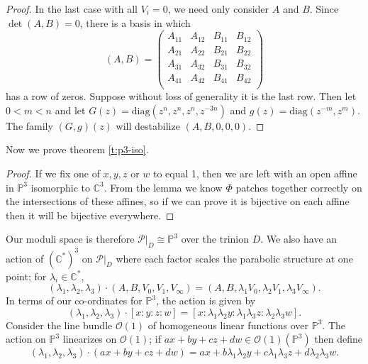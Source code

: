 \documentclass[]{article}
\newcommand{\C}{\mathbb{C}}
\newcommand{\OO}{\mathcal{O}}
\newcommand{\cP}{\mathcal{P}}
\newcommand{\PP}{\mathbb{P}}
\begin{document}
\begin{proof}
		In the last case with all $V_i=0$, we need only consider $A$ and $B$. Since $\det(A,B) = 0$, there is a basis in which
		\begin{equation}
			(A,B) = 
			\begin{pmatrix}
		A_{11} & A_{12}	& B_{11} & B_{12}\\
		A_{21} & A_{22} & B_{21} & B_{22}\\
		A_{31} & A_{32} & B_{31} & B_{32}\\
		A_{41} & A_{42} & B_{41} & B_{42}\\
			\end{pmatrix}
		\end{equation}
		has a row of zeros. Suppose without loss of generality it is the last row. Then let $0 < m < n$ and let $G(z) = \text{diag}(z^{n}, z^{n}, z^{n}, z^{-3n})$ and $g(z) = \text{diag}(z^{-m}, z^{m})$. The family $(G,g)(z)$ will destabilize $(A,B,0,0,0)$. 
	
	\end{proof}
	Now we prove theorem \ref{t:p3-iso}.
	\begin{proof}
		If we fix one of $x,y,z$ or $w$ to equal 1, then we are left with an open affine in $\PP^3$ isomorphic to $\C^3$. From the lemma we know $\Phi$ patches together correctly on the intersections of these affines, so if we can prove it is bijective on each affine then it will be bijective everywhere. 
	\end{proof}
	Our moduli space is therefore $\cP|_D \cong \PP^3$ over the trinion $D$. We also have an action of $(\C^\ast)^3$ on $\cP|_D$ where each factor scales the parabolic structure at one point; for $\lambda_i\in \C^\ast$,
	\begin{equation}
		(\lambda_1,\lambda_2,\lambda_3)\cdot (A,B,V_0,V_1,V_\infty) = (A,B,\lambda_1 V_0, \lambda_2 V_1, \lambda_3 V_\infty).
	\end{equation}
	In terms of our co-ordinates for $\PP^3$, the action is given by
	\begin{equation}
		(\lambda_1, \lambda_2,\lambda_3)\cdot [x:y:z:w] = [x:\lambda_1\lambda_2 y: \lambda_1\lambda_3 z: \lambda_2\lambda_3 w].
	\end{equation}
	Consider the line bundle $\OO(1)$ of homogeneous linear functions over $\PP^3$. The action on $\PP^3$ linearizes on $\OO(1)$; if $ax+by+cz+dw \in \OO(1)(\PP^3)$ then define
	\begin{equation}
	(\lambda_1, \lambda_2,\lambda_3) \cdot (ax+by+cz+dw) = ax +b\lambda_1\lambda_2 y + c\lambda_1\lambda_3 z + d\lambda_2\lambda_3 w. 
	\end{equation}
	
\end{document}
